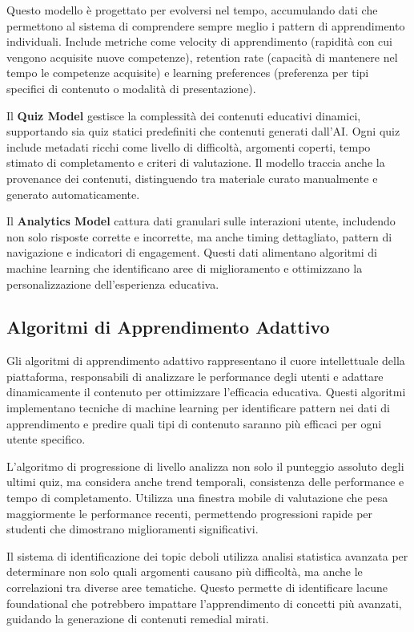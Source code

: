 \documentclass[12pt,a4paper]{article}
\begin{document}
Questo modello è progettato per evolversi nel tempo, accumulando dati che permettono al sistema di comprendere sempre meglio i pattern di apprendimento individuali. Include metriche come velocity di apprendimento (rapidità con cui vengono acquisite nuove competenze), retention rate (capacità di mantenere nel tempo le competenze acquisite) e learning preferences (preferenza per tipi specifici di contenuto o modalità di presentazione).

Il \textbf{Quiz Model} gestisce la complessità dei contenuti educativi dinamici, supportando sia quiz statici predefiniti che contenuti generati dall'AI. Ogni quiz include metadati ricchi come livello di difficoltà, argomenti coperti, tempo stimato di completamento e criteri di valutazione. Il modello traccia anche la provenance dei contenuti, distinguendo tra materiale curato manualmente e generato automaticamente.

Il \textbf{Analytics Model} cattura dati granulari sulle interazioni utente, includendo non solo risposte corrette e incorrette, ma anche timing dettagliato, pattern di navigazione e indicatori di engagement. Questi dati alimentano algoritmi di machine learning che identificano aree di miglioramento e ottimizzano la personalizzazione dell'esperienza educativa.

\subsection{Algoritmi di Apprendimento Adattivo}

Gli algoritmi di apprendimento adattivo rappresentano il cuore intellettuale della piattaforma, responsabili di analizzare le performance degli utenti e adattare dinamicamente il contenuto per ottimizzare l'efficacia educativa. Questi algoritmi implementano tecniche di machine learning per identificare pattern nei dati di apprendimento e predire quali tipi di contenuto saranno più efficaci per ogni utente specifico.

L'algoritmo di progressione di livello analizza non solo il punteggio assoluto degli ultimi quiz, ma considera anche trend temporali, consistenza delle performance e tempo di completamento. Utilizza una finestra mobile di valutazione che pesa maggiormente le performance recenti, permettendo progressioni rapide per studenti che dimostrano miglioramenti significativi.

Il sistema di identificazione dei topic deboli utilizza analisi statistica avanzata per determinare non solo quali argomenti causano più difficoltà, ma anche le correlazioni tra diverse aree tematiche. Questo permette di identificare lacune foundational che potrebbero impattare l'apprendimento di concetti più avanzati, guidando la generazione di contenuti remedial mirati.
\end{document}
